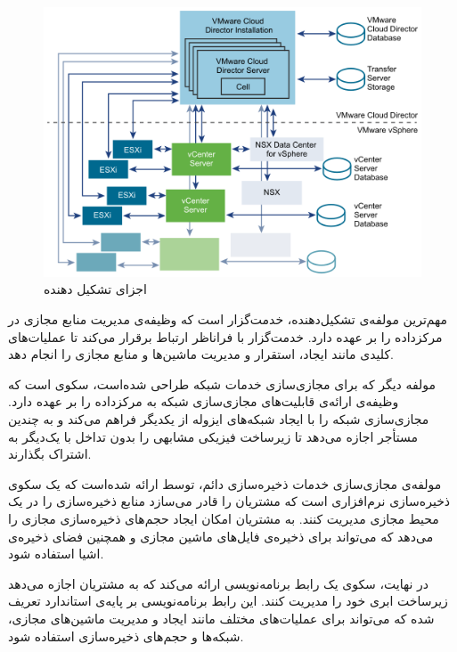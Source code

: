 \begin{figure}[h]
	\vspace{1cm}
	\centering
	\includegraphics[scale=0.7]{figures/vcloud_components.png}
	\caption{اجزای تشکیل دهنده \cite{mstoimenova}}
	\label{fig:vcloud_components}
\end{figure}

مهم‌ترین مولفه‌ی تشکیل‌دهنده، خدمت‌گزار  است که وظیفه‌ی مدیریت منابع مجازی در مرکزداده را بر عهده دارد. خدمت‌گزار  با فراناظر  ارتباط برقرار می‌کند تا عملیات‌های کلیدی مانند ایجاد، استقرار و مدیریت ماشین‌ها و منابع مجازی را انجام دهد.

مولفه دیگر که برای مجازی‌سازی خدمات شبکه طراحی شده‌است، سکوی  است که وظیفه‌ی ارائه‌ی قابلیت‌های مجازی‌سازی شبکه به مرکزداده را بر عهده دارد.  مجازی‌سازی شبکه را با ایجاد شبکه‌های ایزوله از یکدیگر فراهم می‌کند و به چندین مستأجر اجازه می‌دهد تا زیرساخت فیزیکی مشابهی را بدون تداخل با یک‌دیگر به اشتراک بگذارند.

مولفه‌ی مجازی‌سازی‌ خدمات ذخیره‌سازی دائم، توسط  ارائه شده‌است که یک سکو‌ی  ذخیره‌سازی نرم‌افزاری است که مشتریان را قادر می‌سازد منابع ذخیره‌سازی را در یک محیط مجازی مدیریت کنند.  به مشتریان امکان ایجاد حجم‌های ذخیره‌سازی مجازی را می‌دهد که می‌تواند برای ذخیره‌ی فایل‌های ماشین مجازی و همچنین فضای ذخیره‌ی اشیا استفاده شود.

در نهایت، سکو‌ی  یک رابط برنامه‌نویسی ارائه می‌کند که به مشتریان اجازه می‌دهد زیرساخت ابری خود را مدیریت کنند. این رابط برنامه‌نویسی بر پایه‌ی استاندارد  تعریف شده که می‌تواند برای عملیات‌های مختلف مانند ایجاد و مدیریت ماشین‌های مجازی، شبکه‌ها و حجم‌های ذخیره‌سازی استفاده شود.

